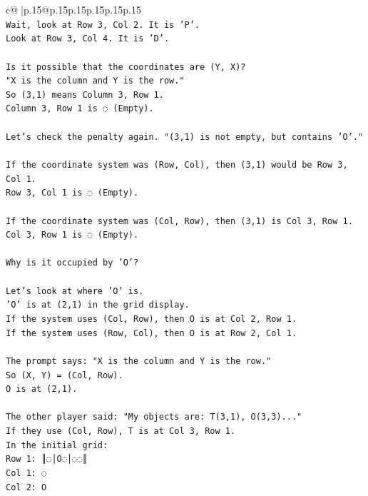 \documentclass{article}
\begin{document}
{\begin{supertabular}{c@{$\;$}|p{.15\linewidth}@{}p{.15\linewidth}p{.15\linewidth}p{.15\linewidth}p{.15\linewidth}p{.15\linewidth}}
{{{\\ 
\texttt{Wait, look at Row 3, Col 2. It is 'P'.} \\
\texttt{Look at Row 3, Col 4. It is 'D'.} \\
\\ 
\texttt{Is it possible that the coordinates are (Y, X)?} \\
\texttt{"X is the column and Y is the row."} \\
\texttt{So (3,1) means Column 3, Row 1.} \\
\texttt{Column 3, Row 1 is ◌ (Empty).} \\
\\ 
\texttt{Let's check the penalty again. "(3,1) is not empty, but contains 'O'."} \\
\\ 
\texttt{If the coordinate system was (Row, Col), then (3,1) would be Row 3, Col 1.} \\
\texttt{Row 3, Col 1 is ◌ (Empty).} \\
\\ 
\texttt{If the coordinate system was (Col, Row), then (3,1) is Col 3, Row 1.} \\
\texttt{Col 3, Row 1 is ◌ (Empty).} \\
\\ 
\texttt{Why is it occupied by 'O'?} \\
\\ 
\texttt{Let's look at where 'O' is.} \\
\texttt{'O' is at (2,1) in the grid display.} \\
\texttt{If the system uses (Col, Row), then O is at Col 2, Row 1.} \\
\texttt{If the system uses (Row, Col), then O is at Row 2, Col 1.} \\
\\ 
\texttt{The prompt says: "X is the column and Y is the row."} \\
\texttt{So (X, Y) = (Col, Row).} \\
\texttt{O is at (2,1).} \\
\\ 
\texttt{The other player said: "My objects are: T(3,1), O(3,3)..."} \\
\texttt{If they use (Col, Row), T is at Col 3, Row 1.} \\
\texttt{In the initial grid:} \\
\texttt{Row 1: ║◌│O◌│◌◌║} \\
\texttt{Col 1: ◌} \\
\texttt{Col 2: O} \\
}}}
\end{supertabular}}
\end{document}
